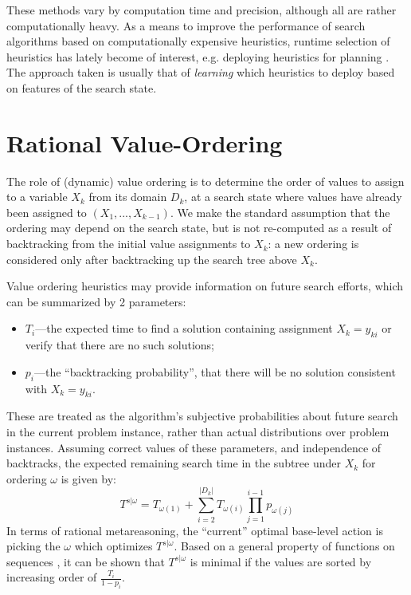 These methods vary by computation time and precision, although all are
rather computationally heavy. As a means to improve the performance of
search algorithms based on computationally expensive heuristics,
runtime selection of heuristics has lately become of interest, e.g.
deploying heuristics for planning \cite{Domshlak.maxornot}. The
approach taken is usually that of {\em learning} which heuristics to
deploy based on features of the search state.

\section{Rational Value-Ordering}
\label{sec:csp-generic}

The role of (dynamic) value ordering is to determine the order of
values to assign to a variable $X_k$ from its domain $D_k$, at a
search state where values have already been assigned to $(X_1, ...,
X_{k-1})$. We make the standard assumption that the ordering may
depend on the search state, but is not re-computed as a result of
backtracking from the initial value assignments to $X_k$: a new
ordering is considered only after backtracking up the search tree
above $X_k$.

Value ordering heuristics may provide information on future search
efforts, which can be summarized by 2 parameters:
\begin{itemize}
\item  $T_i$---the expected time to find a solution containing
  assignment  $X_k=y_{ki}$ or verify that there are no such solutions;
\item  $p_i$---the ``backtracking probability'', that there will be no solution
consistent with $X_k=y_{ki}$.
\end{itemize}
These are treated as the algorithm's subjective probabilities about future search
in the current problem instance, rather than actual distributions over problem instances.
Assuming correct values of these parameters, and independence of backtracks,
the expected remaining search time in the subtree under $X_k$ for ordering $\omega$ is given by:
\begin{equation}
\label{eq:expected-search-time}
T^{s|\omega}=T_{\omega(1)}+\sum_{i=2}^{|D_k|}T_{\omega(i)}\prod_{j=1}^{i-1}p_{\omega(j)}
\end{equation}
In terms of rational metareasoning, the ``current'' optimal base-level action is picking
the $\omega $ which optimizes $T^{s|\omega}$.
Based on a general property of functions on sequences \cite{MonmaSidney.sequencing}, it can
be shown that $T^{s|\omega}$ is minimal if 
the values are sorted  by increasing order of $\frac {T_i} {1-p_i}$.

